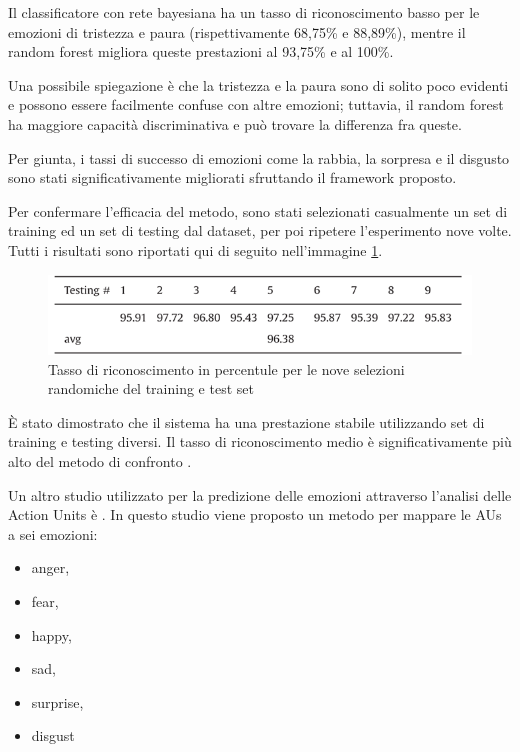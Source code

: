 Il classificatore con rete bayesiana ha un tasso di riconoscimento basso per le emozioni di tristezza e paura (rispettivamente 68,75\% e 88,89\%), mentre il random forest migliora queste prestazioni al 93,75\% e al 100\%.

Una possibile spiegazione è che la tristezza e la paura sono di solito poco evidenti e possono essere facilmente confuse con altre emozioni; tuttavia, il random forest ha maggiore capacità discriminativa e può trovare la differenza fra queste. 

Per giunta, i tassi di successo di emozioni come la rabbia, la sorpresa e il disgusto sono stati significativamente migliorati sfruttando il framework proposto. 

Per confermare l'efficacia del metodo, sono stati selezionati casualmente un set di training ed un set di testing dal dataset, per poi ripetere l'esperimento nove volte. Tutti i risultati sono riportati qui di seguito nell'immagine \ref{fig:image4}. 
\begin{figure}
    \begin{center}    
        \includegraphics[width=1\linewidth]{images/17.png}
        \caption{Tasso di riconoscimento in percentule per le nove selezioni randomiche del training e test set}
        \label{fig:image4}
    \end{center}
\end{figure}

È stato dimostrato che il sistema ha una prestazione stabile utilizzando set di training e testing diversi. 
Il tasso di riconoscimento medio è significativamente più alto del metodo di confronto \cite{LearnExpresSpatTempManiFoldDynamFaceExpressReco}.

Un altro studio utilizzato per la predizione delle emozioni attraverso l’analisi delle Action Units è \cite{InferEmoFaceAUs}.
In questo studio viene proposto un metodo per mappare le AUs a sei emozioni:
\begin{itemize}
    \item anger,
    \item fear,
    \item happy,
    \item sad,
    \item surprise,
    \item disgust
\end{itemize}

